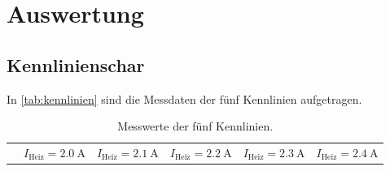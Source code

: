 \section{Auswertung}
\label{sec:Auswertung}


\subsection{Kennlinienschar}

In \autoref{tab:kennlinien} sind die Messdaten der fünf Kennlinien aufgetragen.
\begin{table}
  \centering
  \caption{Messwerte der fünf Kennlinien.}
  \label{tab:kennlinien}
  \begin{tabular}{c c c c c c}
    \toprule
    & \multicolumn{1}{c}{$I_{\text{Heiz}} = \qty{2.0}{\ampere}$} &
      \multicolumn{1}{c}{$I_{\text{Heiz}} = \qty{2.1}{\ampere}$} &
      \multicolumn{1}{c}{$I_{\text{Heiz}} = \qty{2.2}{\ampere}$} &
      \multicolumn{1}{c}{$I_{\text{Heiz}} = \qty{2.3}{\ampere}$} &
      \multicolumn{1}{c}{$I_{\text{Heiz}} = \qty{2.4}{\ampere}$} \\
      \cmidrule(lr){2-2}\cmidrule(lr){3-3}\cmidrule(lr){4-4}\cmidrule(lr){5-5}\cmidrule(lr){6-6}


\end{tabular}
\end{table}
